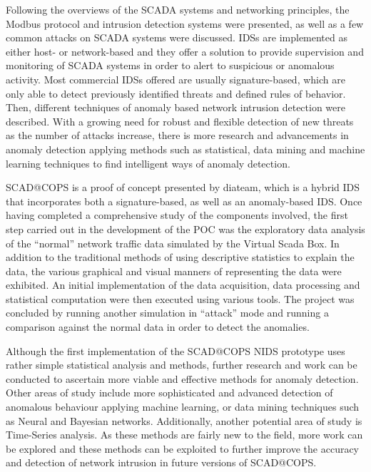 \documentclass[11pt,]{article}
\begin{document}
Following the overviews of the SCADA systems and networking principles,
the Modbus protocol and intrusion detection systems were presented, as
well as a few common attacks on SCADA systems were discussed. IDSs are
implemented as either host- or network-based and they offer a solution
to provide supervision and monitoring of SCADA systems in order to alert
to suspicious or anomalous activity. Most commercial IDSs offered are
usually signature-based, which are only able to detect previously
identified threats and defined rules of behavior. Then, different
techniques of anomaly based network intrusion detection were described.
With a growing need for robust and flexible detection of new threats as
the number of attacks increase, there is more research and advancements
in anomaly detection applying methods such as statistical, data mining
and machine learning techniques to find intelligent ways of anomaly
detection.

SCAD@COPS is a proof of concept presented by diateam, which is a hybrid
IDS that incorporates both a signature-based, as well as an
anomaly-based IDS. Once having completed a comprehensive study of the
components involved, the first step carried out in the development of
the POC was the exploratory data analysis of the ``normal'' network
traffic data simulated by the Virtual Scada Box. In addition to the
traditional methods of using descriptive statistics to explain the data,
the various graphical and visual manners of representing the data were
exhibited. An initial implementation of the data acquisition, data
processing and statistical computation were then executed using various
tools. The project was concluded by running another simulation in
``attack'' mode and running a comparison against the normal data in
order to detect the anomalies.

Although the first implementation of the SCAD@COPS NIDS prototype uses
rather simple statistical analysis and methods, further research and
work can be conducted to ascertain more viable and effective methods for
anomaly detection. Other areas of study include more sophisticated and
advanced detection of anomalous behaviour applying machine learning, or
data mining techniques such as Neural and Bayesian networks.
Additionally, another potential area of study is Time-Series analysis.
As these methods are fairly new to the field, more work can be explored
and these methods can be exploited to further improve the accuracy and
detection of network intrusion in future versions of SCAD@COPS.
\end{document}
